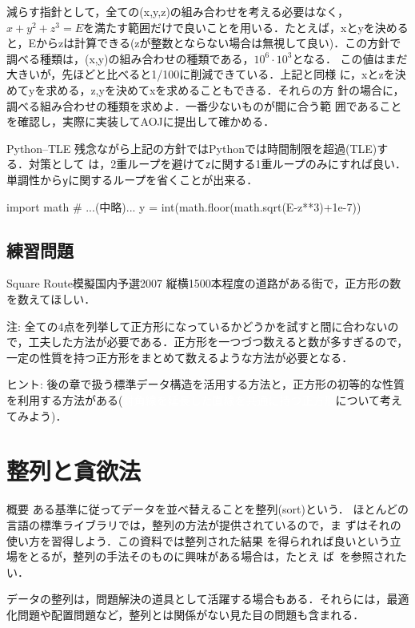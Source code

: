 減らす指針として，全ての(x,y,z)の組み合わせを考える必要はなく，
$x+y^2+z^3=E$を満たす範囲だけで良いことを用いる．たとえば，xとyを決める
と，Eからzは計算できる(zが整数とならない場合は無視して良い)．この方針で
調べる種類は，(x,y)の組み合わせの種類である，$10^6 \cdot 10^3$となる．
この値はまだ大きいが，先ほどと比べると1/100に削減できている．上記と同様
に，xとzを決めてyを求める，z,yを決めてxを求めることもできる．それらの方
針の場合に，調べる組み合わせの種類を求めよ．一番少ないものが間に合う範
囲であることを確認し，実際に実装してAOJに提出して確かめる．

\begin{debugbox}{Python--TLE}
残念ながら上記の方針ではPythonでは時間制限を超過(TLE)する．対策として
は，2重ループを避けて\texttt{z}に関する1重ループのみにすれば良い．
単調性から\texttt{y}に関するループを省くことが出来る．
\begin{pybox}
import math
# ...(中略)...
y = int(math.floor(math.sqrt(E-z**3)+1e-7))
\end{pybox}
\end{debugbox}

\section{練習問題}
\begin{pbox}{Square Route}{模擬国内予選2007}
縦横1500本程度の道路がある街で，正方形の数を数えてほしい．

\end{pbox}

注: 全ての4点を列挙して正方形になっているかどうかを試すと間に合わないので，工夫した方法が必要である．正方形を一つづつ数えると数が多すぎるので，一定の性質を持つ正方形をまとめて数えるような方法が必要となる．

ヒント: 後の章で扱う標準データ構造を活用する方法と，正方形の初等的な性質を利用する方法がある(\textcolor{white}{対角線を延長した直線を共通に持つ正方形}について考えてみよう)．


\chapter{整列と貪欲法}\label{chapter:greedy}

\begin{itembox}[l]{概要}
ある基準に従ってデータを並べ替えることを整列(sort)という．
ほとんどの言語の標準ライブラリでは，整列の方法が提供されているので，ま
ずはそれの使い方を習得しよう．この資料では整列された結果
を得られれば良いという立場をとるが，整列の手法そのものに興味がある場合は，たとえ
ば~\pcaojbook[pp.~51--(3章)]を参照されたい．

データの整列は，問題解決の道具として活躍する場合もある．それらには，最適化問題や配置問題など，整列とは関係がない見た目の問題も含まれる．
\end{itembox}

